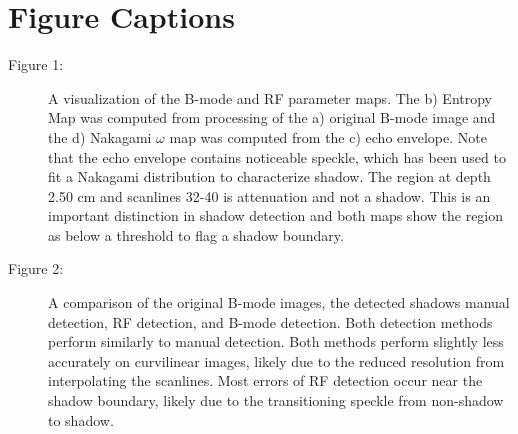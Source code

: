 \documentclass[authoryear,preprint,review,12pt]{elsarticle}
\begin{document}
\pagebreak







\pagebreak

\section*{Figure Captions}

\begin{description}
\item[Figure 1:]  A visualization of the B-mode and RF parameter maps. The b) Entropy Map was computed from processing of the a) original B-mode image and the d) Nakagami $\omega$ map was computed from the c) echo envelope. Note that the echo envelope contains noticeable speckle, which has been used to fit a Nakagami distribution to characterize shadow. The region at depth 2.50 cm and scanlines 32-40 is attenuation and not a shadow. This is an important distinction in shadow detection and both maps show the region as below a threshold to flag a shadow boundary.
\item[Figure 2:]  A comparison of the original B-mode images, the detected shadows manual detection, RF detection, and B-mode detection. Both detection methods perform similarly to manual detection. Both methods perform slightly less accurately on curvilinear images, likely due to the reduced resolution from interpolating the scanlines. Most errors of RF detection occur near the shadow boundary, likely due to the transitioning speckle from non-shadow to shadow.
\end{description}



\end{document}

